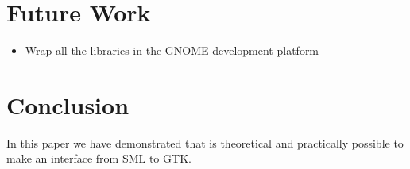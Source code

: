 \documentclass[workingdraft,endnotes]{usetex-v1}
\begin{document}
\section{Future Work}
\label{sec:future-work}

\begin{itemize}
\item Wrap all the libraries in the GNOME development platform
\end{itemize}



\section{Conclusion}
\label{sec:conclusion}

In this paper we have demonstrated that is theoretical and practically
possible to make an interface from SML to GTK.
\end{document}
